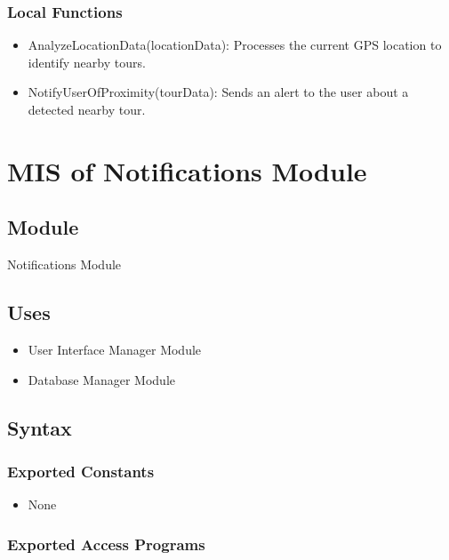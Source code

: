 \documentclass[12pt, titlepage]{article}
\begin{document}
\subsubsection{Local Functions}

\begin{itemize}
  \item AnalyzeLocationData(locationData): Processes the current GPS location to identify nearby tours.
  \item NotifyUserOfProximity(tourData): Sends an alert to the user about a detected nearby tour.
\end{itemize}

\newpage


\section{MIS of Notifications Module} \label{Module_Notifications}

\subsection{Module}

Notifications Module

\subsection{Uses}

\begin{itemize}
  \item User Interface Manager Module
  \item Database Manager Module
\end{itemize}

\subsection{Syntax}

\subsubsection{Exported Constants}

\begin{itemize}
  \item None
\end{itemize}

\subsubsection{Exported Access Programs}
\end{document}
